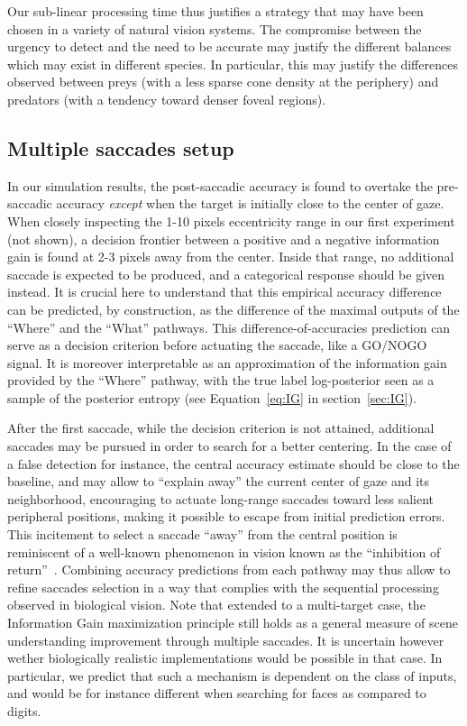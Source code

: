 Our sub-linear processing time thus justifies a strategy that may have been chosen in a variety of natural vision systems. The compromise between the urgency to detect and the need to be accurate may justify the different balances which may exist in different species. In particular, this may justify the differences observed between preys (with a less sparse cone density at the periphery) and predators (with a tendency toward  denser foveal regions). %

%
\subsection{Multiple saccades setup}
%
In our simulation results, the post-saccadic accuracy is found to overtake the pre-saccadic accuracy \emph{except} when the target is initially close to the center of gaze. When closely inspecting the 1-10 pixels eccentricity range in our first experiment (not shown), a decision frontier between a positive and a negative information gain is found at 2-3 pixels away from the center. Inside that range, no additional saccade is expected to be produced, and a categorical response should be given instead. It is crucial here to understand that this empirical accuracy difference can be predicted, by construction, as the difference of the maximal outputs of the ``Where'' and the ``What'' pathways. This difference-of-accuracies prediction can serve as a decision criterion before actuating the saccade, like a GO/NOGO signal. It is moreover interpretable as an approximation of the information gain provided by the ``Where'' pathway, with the true label log-posterior seen as a sample of the posterior entropy (see Equation~\ref{eq:IG} in section~\ref{sec:IG}).

After the first saccade, while the decision criterion is not attained, additional saccades may be pursued in order to search for a better centering. In the case of a false detection for instance, the central accuracy estimate should be close to the baseline, and may allow to ``explain away'' the current center of gaze and its neighborhood, encouraging to actuate long-range saccades toward less salient peripheral positions, making it possible to escape from initial prediction errors. This incitement to select a saccade ``away'' from the central position is reminiscent of a well-known phenomenon in vision known as the ``inhibition of return''~\cite{Itti01}. Combining accuracy predictions from each pathway may thus allow to refine saccades selection in a way that complies with the sequential processing observed in biological vision. Note that extended to a multi-target case, the Information Gain maximization principle still holds as a general measure of scene understanding improvement through multiple saccades. It is uncertain however wether biologically realistic implementations would be possible in that case. In particular, we predict that such a mechanism is dependent on the class of inputs, and would be for instance different when searching for faces as compared to digits.

